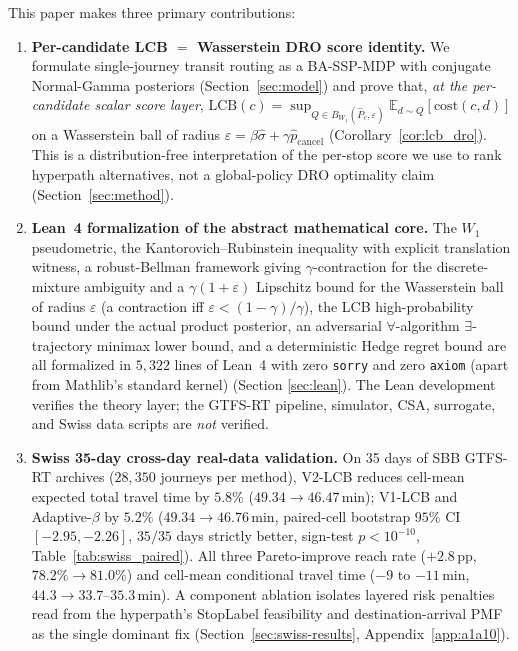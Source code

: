 \documentclass[11pt]{article}
\theoremstyle{definition}
\theoremstyle{remark}
\begin{document}
This paper makes three primary contributions:
\begin{enumerate}
\item \textbf{Per-candidate LCB $=$ Wasserstein DRO score identity.} We
formulate single-journey transit routing as a BA-SSP-MDP with conjugate
Normal-Gamma posteriors (Section~\ref{sec:model}) and prove that, \emph{at
the per-candidate scalar score layer}, $\mathrm{LCB}(c) = \sup_{Q \in
B_{W_1}(\hat P_c, \varepsilon)} \mathbb{E}_{d \sim Q}[\mathrm{cost}(c, d)]$
on a Wasserstein ball of radius $\varepsilon = \beta\hat\sigma +
\gamma\hat{p}_{\mathrm{cancel}}$ (Corollary~\ref{cor:lcb_dro}). This is
a distribution-free interpretation of the per-stop score we use to rank
hyperpath alternatives, not a global-policy DRO optimality claim
(Section~\ref{sec:method}).
\item \textbf{Lean~4 formalization of the abstract mathematical core.}
The $W_1$ pseudometric, the Kantorovich--Rubinstein inequality with
explicit translation witness, a robust-Bellman framework giving
$\gamma$-contraction for the discrete-mixture ambiguity and a
$\gamma(1+\varepsilon)$ Lipschitz bound for the Wasserstein ball
of radius $\varepsilon$ (a contraction iff $\varepsilon\!<\!(1{-}\gamma)/\gamma$),
the LCB
high-probability bound under the actual product posterior, an
adversarial $\forall$-algorithm $\exists$-trajectory minimax lower
bound, and a deterministic Hedge regret bound are all formalized in
$5{,}322$ lines of Lean~4 with zero \texttt{sorry} and zero
\texttt{axiom} (apart from Mathlib's standard kernel) (Section
\ref{sec:lean}). The Lean development verifies the theory layer; the
GTFS-RT pipeline, simulator, CSA, surrogate, and Swiss data scripts are
\emph{not} verified.
\item \textbf{Swiss 35-day cross-day real-data validation.} On 35
days of SBB GTFS-RT archives ($28{,}350$ journeys per method),
V2-LCB reduces cell-mean expected total travel time by $5.8\%$
($49.34\!\to\!46.47$\,min); V1-LCB and Adaptive-$\beta$ by $5.2\%$
($49.34\!\to\!46.76$\,min, paired-cell bootstrap $95\%$ CI
$[-2.95, -2.26]$, $35/35$ days strictly better, sign-test
$p\!<\!10^{-10}$, Table~\ref{tab:swiss_paired}). All three
Pareto-improve reach rate ($+2.8$\,pp, $78.2\%\!\to\!81.0\%$) and
cell-mean conditional travel time ($-9$ to $-11$\,min,
$44.3\!\to\!33.7$--$35.3$\,min). A component ablation isolates layered
risk penalties read from the hyperpath's StopLabel feasibility and
destination-arrival PMF as the single dominant fix
(Section~\ref{sec:swiss-results}, Appendix~\ref{app:a1a10}).
\end{enumerate}
\end{document}
